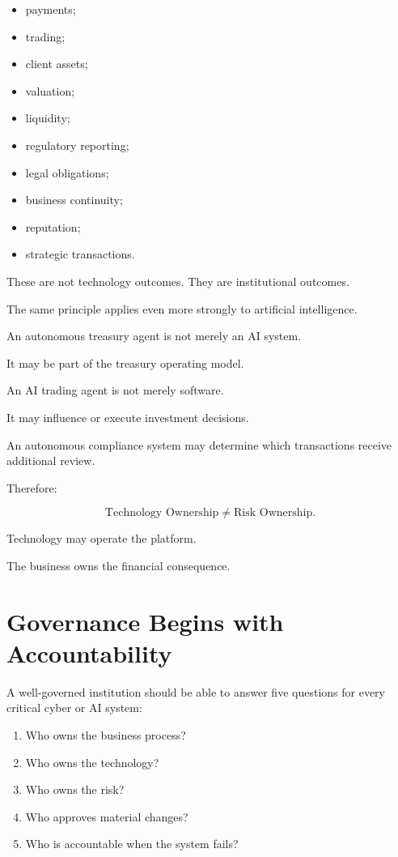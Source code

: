 \begin{itemize}
    \item payments;
    \item trading;
    \item client assets;
    \item valuation;
    \item liquidity;
    \item regulatory reporting;
    \item legal obligations;
    \item business continuity;
    \item reputation;
    \item strategic transactions.
\end{itemize}

These are not technology outcomes. They are institutional outcomes.

The same principle applies even more strongly to artificial intelligence.

An autonomous treasury agent is not merely an AI system.

It may be part of the treasury operating model.

An AI trading agent is not merely software.

It may influence or execute investment decisions.

An autonomous compliance system may determine which transactions receive additional review.

Therefore:

\begin{equation}
\text{Technology Ownership}
\neq
\text{Risk Ownership}.
\end{equation}

Technology may operate the platform.

The business owns the financial consequence.

\section{Governance Begins with Accountability}

A well-governed institution should be able to answer five questions for every critical cyber or AI system:

\begin{enumerate}
    \item Who owns the business process?
    \item Who owns the technology?
    \item Who owns the risk?
    \item Who approves material changes?
    \item Who is accountable when the system fails?
\end{enumerate}

